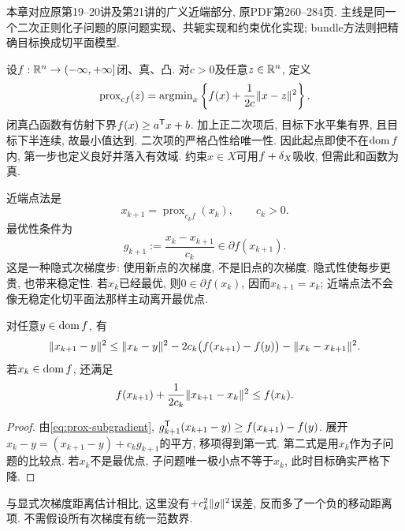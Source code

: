 \label{chap:9}
本章对应原第19--20讲及第21讲的广义近端部分, 原PDF第260--284页. 主线是同一个二次正则化子问题的原问题实现、共轭实现和约束优化实现; bundle方法则把精确目标换成切平面模型.

设$f:\mathbb R^n\to(-\infty,+\infty]$闭、真、凸. 对$c>0$及任意$z\in\mathbb R^n$, 定义
\[
 \operatorname{prox}_{cf}(z)=\operatorname{argmin}_x\left\{f(x)+\frac1{2c}\lVert x-z\rVert^2\right\}.
\]
闭真凸函数有仿射下界$f(x)\ge a^{\mathsf T} x+b$. 加上正二次项后, 目标下水平集有界, 且目标下半连续, 故最小值达到. 二次项的严格凸性给唯一性. 因此起点即使不在$\operatorname{dom} f$内, 第一步也定义良好并落入有效域. 约束$x\in X$可用$f+\delta_{X}$吸收, 但需此和函数为真.

近端点法是
\begin{equation}\label{eq:proximal-point}
 x_{k+1}=\operatorname{prox}_{c_k f}(x_k),\qquad c_k>0.
\end{equation}
最优性条件为
\begin{equation}\label{eq:prox-subgradient}
 g_{k+1}:=\frac{x_k-x_{k+1}}{c_k}\in\partial f(x_{k+1}).
\end{equation}
这是一种隐式次梯度步: 使用新点的次梯度, 不是旧点的次梯度. 隐式性使每步更贵, 也带来稳定性. 若$x_k$已经最优, 则$0\in\partial f(x_k)$, 因而$x_{k+1}=x_k$; 近端点法不会像无稳定化切平面法那样主动离开最优点.

\begin{lemma}\label{lem:prox-distance}
对任意$y\in\operatorname{dom} f$, 有
\begin{equation}\label{eq:prox-distance}
 \lVert x_{k+1}-y\rVert^2\le\lVert x_k-y\rVert^2
 -2c_k\bigl(f(x_{k+1})-f(y)\bigr)-\lVert x_k-x_{k+1}\rVert^2.
\end{equation}
若$x_k\in\operatorname{dom} f$, 还满足
\[
 f(x_{k+1})+\frac1{2c_k}\lVert x_{k+1}-x_k\rVert^2\le f(x_k).
\]
\end{lemma}
\begin{proof}
由\eqref{eq:prox-subgradient}, $g_{k+1}^{\mathsf T}(x_{k+1}-y)\ge f(x_{k+1})-f(y)$. 展开$x_k-y=(x_{k+1}-y)+c_k g_{k+1}$的平方, 移项得到第一式. 第二式是用$x_k$作为子问题的比较点. 若$x_k$不是最优点, 子问题唯一极小点不等于$x_k$, 此时目标确实严格下降.
\end{proof}

与显式次梯度距离估计相比, 这里没有$+c_k^2\lVert g\rVert^2$误差, 反而多了一个负的移动距离项. 不需假设所有次梯度有统一范数界.

